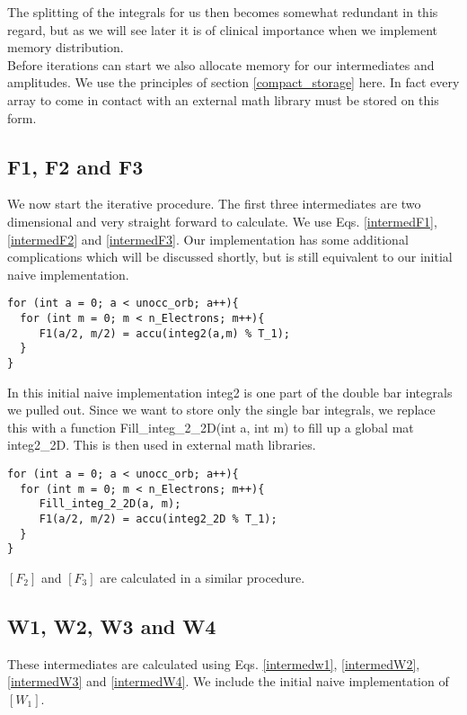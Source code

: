 The splitting of the integrals for us then becomes somewhat redundant in this regard, but as we will see later it is of clinical importance when we implement memory distribution. \\

Before iterations can start we also allocate memory for our intermediates and amplitudes. We use the principles of section \ref{compact_storage} here. In fact every array to come in contact with an external math library must be stored on this form.

\subsection{F1, F2 and F3}
We now start the iterative procedure. The first three intermediates are two dimensional and
very straight forward to calculate. We use Eqs. \eqref{intermedF1}, \eqref{intermedF2} and \eqref{intermedF3}. Our implementation has some additional complications which will be discussed shortly, but is still equivalent to our initial naive implementation.

\begin{lstlisting}
for (int a = 0; a < unocc_orb; a++){
  for (int m = 0; m < n_Electrons; m++){
     F1(a/2, m/2) = accu(integ2(a,m) % T_1);
  }
}
\end{lstlisting}

In this initial naive implementation integ2 is one part of the double bar integrals we pulled out. Since we want to store only the single bar integrals, we replace this with a function Fill\_integ\_2\_2D(int a, int m) to fill up a global mat integ2\_2D. This is then used in external math libraries.

\begin{lstlisting}
for (int a = 0; a < unocc_orb; a++){
  for (int m = 0; m < n_Electrons; m++){
     Fill_integ_2_2D(a, m);
     F1(a/2, m/2) = accu(integ2_2D % T_1);
  }
}
\end{lstlisting}

$[F_2]$ and $[F_3]$ are calculated in a similar procedure.

\subsection{W1, W2, W3 and W4}
These intermediates are calculated using Eqs. \eqref{intermedw1}, \eqref{intermedW2}, \eqref{intermedW3} and \eqref{intermedW4}. We include the initial naive implementation of $[W_1]$.

